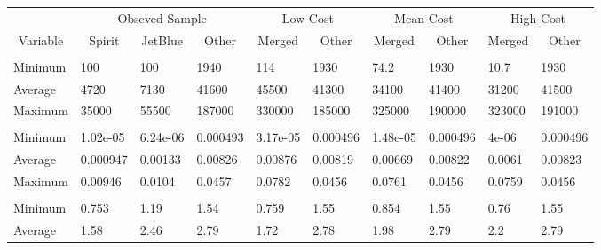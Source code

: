 
\begin{tabular}[t]{llllllllll}
\toprule
\multicolumn{1}{c}{ } & \multicolumn{3}{c}{Obseved Sample} & \multicolumn{2}{c}{Low-Cost} & \multicolumn{2}{c}{Mean-Cost} & \multicolumn{2}{c}{High-Cost} \\
\cmidrule(l{3pt}r{3pt}){2-4} \cmidrule(l{3pt}r{3pt}){5-6} \cmidrule(l{3pt}r{3pt}){7-8} \cmidrule(l{3pt}r{3pt}){9-10}
\multicolumn{1}{c}{Variable} & \multicolumn{1}{c}{Spirit} & \multicolumn{1}{c}{JetBlue} & \multicolumn{1}{c}{Other} & \multicolumn{1}{c}{Merged} & \multicolumn{1}{c}{Other} & \multicolumn{1}{c}{Merged} & \multicolumn{1}{c}{Other} & \multicolumn{1}{c}{Merged} & \multicolumn{1}{c}{Other} \\
\cmidrule(l{3pt}r{3pt}){1-1} \cmidrule(l{3pt}r{3pt}){2-2} \cmidrule(l{3pt}r{3pt}){3-3} \cmidrule(l{3pt}r{3pt}){4-4} \cmidrule(l{3pt}r{3pt}){5-5} \cmidrule(l{3pt}r{3pt}){6-6} \cmidrule(l{3pt}r{3pt}){7-7} \cmidrule(l{3pt}r{3pt}){8-8} \cmidrule(l{3pt}r{3pt}){9-9} \cmidrule(l{3pt}r{3pt}){10-10}
\addlinespace[0.3em]
\multicolumn{10}{l}{\textbf{Passengers}}\\
\hspace{1em}Minimum & 100 & 100 & 1940 & 114 & 1930 & 74.2 & 1930 & 10.7 & 1930\\
\hspace{1em}Average & 4720 & 7130 & 41600 & 45500 & 41300 & 34100 & 41400 & 31200 & 41500\\
\hspace{1em}Maximum & 35000 & 55500 & 187000 & 330000 & 185000 & 325000 & 190000 & 323000 & 191000\\
\addlinespace[0.3em]
\multicolumn{10}{l}{\textbf{Market Share}}\\
\hspace{1em}Minimum & 1.02e-05 & 6.24e-06 & 0.000493 & 3.17e-05 & 0.000496 & 1.48e-05 & 0.000496 & 4e-06 & 0.000496\\
\hspace{1em}Average & 0.000947 & 0.00133 & 0.00826 & 0.00876 & 0.00819 & 0.00669 & 0.00822 & 0.0061 & 0.00823\\
\hspace{1em}Maximum & 0.00946 & 0.0104 & 0.0457 & 0.0782 & 0.0456 & 0.0761 & 0.0456 & 0.0759 & 0.0456\\
\addlinespace[0.3em]
\multicolumn{10}{l}{\textbf{Prices}}\\
\hspace{1em}Minimum & 0.753 & 1.19 & 1.54 & 0.759 & 1.55 & 0.854 & 1.55 & 0.76 & 1.55\\
\hspace{1em}Average & 1.58 & 2.46 & 2.79 & 1.72 & 2.78 & 1.98 & 2.79 & 2.2 & 2.79\\

\end{tabular}

